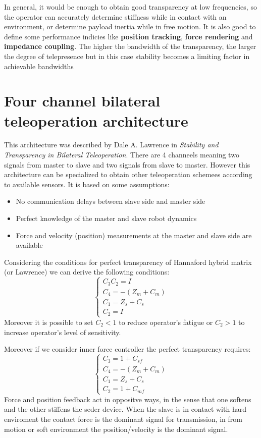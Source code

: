 \documentclass[a4paper,12pt]{article}
\begin{document}
In general, it would be enough to obtain good transparency at low frequencies, so the
operator can accurately determine stiffness while in contact with an environment, or
determine payload inertia while in free motion. It is also good to define some performance indicies like \textbf{position tracking}, \textbf{force rendering} and \textbf{impedance coupling}.
The higher the bandwidth of the transparency, the larger the degree of telepresence but in this case stability becomes a limiting factor in achievable bandwidths

\section{Four channel bilateral teleoperation architecture}

This architecture was described by Dale A. Lawrence in \textit{Stability and Transparency in Bilateral Teleoperation}. There are 4 channeels meaning two signals from master to slave and two signals from slave to master. However this architecture can be specialized to obtain other teleoperation schemees according to available sensors. It is based on some assumptions:
\begin{itemize}
    \item No communication delays between slave side and master side
    \item Perfect knowledge of the master and slave robot dynamics
    \item Force and velocity (position) measurements at the master and slave side are available
\end{itemize}
Considering the conditions for perfect transparency of Hannaford hybrid matrix (or Lawrence) we can derive the following conditions:
\[
\begin{cases}
    C_3C_2 = I\\
    C_4 = -(Z_m + C_m) \\
    C_1 = Z_s + C_s \\
    C_2 = I
\end{cases}
\]
Moreover it is possible to set $C_2 < 1$ to reduce operator's fatigue or $C_2 > 1$ to increase operator's level of sensitivity. 

\bigskip
\noindent Moreover if we consider inner force controller the perfect transparency requires:
\[
\begin{cases}
    C_3 = 1 + C_{sf}\\
    C_4 = -(Z_m + C_m) \\
    C_1 = Z_s + C_s \\
    C_2 = 1 + C_{mf}
\end{cases}
\]
Force and position feedback act in oppositve ways, in the sense that one softens and the other stiffens the seder device. When the slave is in contact with hard enviroment the contact force is the dominant signal for transmission, in from motion or soft environment the position/velocity is the dominant signal.
\end{document}
